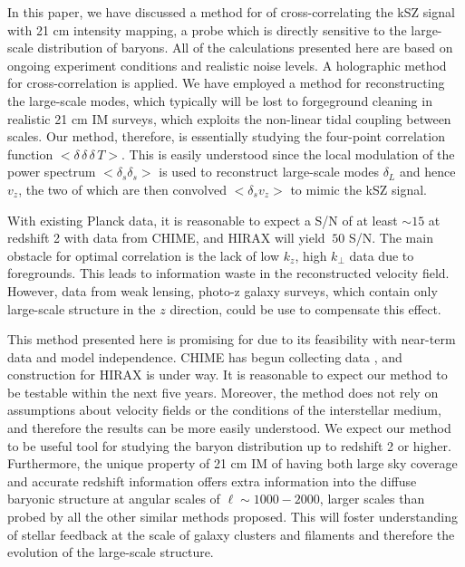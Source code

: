 In this paper, we have discussed a method for of cross-correlating the kSZ signal with 21 cm intensity mapping, a probe which is directly sensitive to the large-scale distribution of baryons. All of the calculations presented here are based on ongoing experiment conditions and realistic noise levels. A holographic method for cross-correlation is applied.  We have employed a method for reconstructing the large-scale modes, which typically will be lost to forgeground cleaning in realistic 21 cm IM surveys, which exploits the non-linear tidal coupling between scales. Our method, therefore, is essentially studying the four-point correlation function $<\delta\,\delta\,\delta\, T>$. This is easily understood since the local modulation of the power spectrum $<\delta_s \delta_s>$ is used to reconstruct large-scale modes $\delta_L$ and hence $v_z$, the two of which are then convolved $<\delta_s v_z> $ to mimic the kSZ signal. 

With existing Planck data, it is reasonable to expect a S/N of at least $\sim15$ at redshift 2 with data from CHIME, and HIRAX will yield $~50$ S/N.  The main obstacle for optimal correlation is the lack of low $k_z$, high $k_\perp$ data due to foregrounds. This leads to information waste in the reconstructed velocity field.  However, data from weak lensing,  photo-z galaxy surveys, which contain only large-scale structure in the $z$ direction, could be use to compensate this effect.
 
This method presented here is promising for due to its feasibility with near-term data and model independence. CHIME has begun collecting data , and construction for HIRAX is under way.  It is reasonable to expect our method to be testable within the next five years. Moreover, the method does not rely on assumptions about velocity fields or the conditions of the interstellar medium, and therefore the results can be more easily understood.  We expect our method to be useful tool for studying the baryon distribution up to redshift 2 or higher. Furthermore, the unique property of 21 cm IM of having both large sky coverage and accurate redshift information offers extra information into the diffuse baryonic structure at angular scales of $\ell\sim 1000-2000$, larger scales than probed by all the other similar methods proposed. This will foster understanding of stellar feedback at the scale of galaxy clusters and filaments and therefore the evolution of the large-scale structure.
